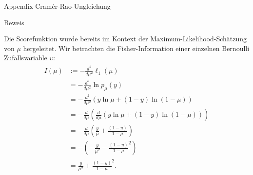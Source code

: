 \documentclass[
  8pt,
  ignorenonframetext,
]{beamer}
\newcommand{\ups} {\upsilon}
\begin{document}
\begin{frame}{Appendix \textbar{} Cramér-Rao-Ungleichung}
\protect\hypertarget{appendix-cramuxe9r-rao-ungleichung-9}{}
\footnotesize

\underline{Beweis}

Die Scorefunktion wurde bereits im Kontext der
Maximum-Likelihood-Schätzung von \(\mu\) hergeleitet. Wir betrachten die
Fisher-Information einer einzelnen Bernoulli Zufallsvariable \(\ups\):
\begin{align}
\begin{split}
I(\mu)
& := -\frac{d^2}{d\mu^2} \ell_1(\mu)                                                            \\
&  = -\frac{d^2}{d\mu^2} \ln p_\mu(y)                                                       \\
&  = -\frac{d^2}{d\mu^2}\left(y \ln \mu + (1 - y) \ln (1-\mu)\right)                            \\
&  = -\frac{d}{d\mu}\left(\frac{d}{d\mu}\left(y \ln \mu + (1 - y) \ln (1-\mu)\right)\right) \\
&  = -\frac{d}{d\mu}\left(\frac{y}{\mu} + \frac{(1 - y)}{1-\mu}\right)                      \\
&  = -\left(-\frac{y}{\mu^2} - \frac{(1 - y)}{1-\mu}^{2}\right)                                 \\
&  =  \frac{y}{\mu^2} + \frac{(1 - y)}{1-\mu}^{2}.                                          \\
\end{split}
\end{align}
\end{frame}
\end{document}

